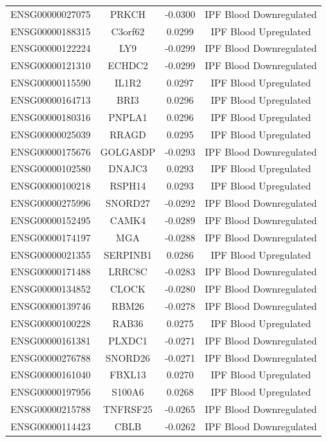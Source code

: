 \documentclass[
]{article}
\begin{document}
\begin{singlespace}
\begin{longtable}[t]{lccc}
ENSG00000027075 & PRKCH & -0.0300 & IPF Blood Downregulated\\
ENSG00000188315 & C3orf62 & 0.0299 & IPF Blood Upregulated\\
ENSG00000122224 & LY9 & -0.0299 & IPF Blood Downregulated\\
ENSG00000121310 & ECHDC2 & -0.0299 & IPF Blood Downregulated\\
\addlinespace
ENSG00000115590 & IL1R2 & 0.0297 & IPF Blood Upregulated\\
ENSG00000164713 & BRI3 & 0.0296 & IPF Blood Upregulated\\
ENSG00000180316 & PNPLA1 & 0.0296 & IPF Blood Upregulated\\
ENSG00000025039 & RRAGD & 0.0295 & IPF Blood Upregulated\\
ENSG00000175676 & GOLGA8DP & -0.0293 & IPF Blood Downregulated\\
\addlinespace
ENSG00000102580 & DNAJC3 & 0.0293 & IPF Blood Upregulated\\
ENSG00000100218 & RSPH14 & 0.0293 & IPF Blood Upregulated\\
ENSG00000275996 & SNORD27 & -0.0292 & IPF Blood Downregulated\\
ENSG00000152495 & CAMK4 & -0.0289 & IPF Blood Downregulated\\
ENSG00000174197 & MGA & -0.0288 & IPF Blood Downregulated\\
\addlinespace
ENSG00000021355 & SERPINB1 & 0.0286 & IPF Blood Upregulated\\
ENSG00000171488 & LRRC8C & -0.0283 & IPF Blood Downregulated\\
ENSG00000134852 & CLOCK & -0.0280 & IPF Blood Downregulated\\
ENSG00000139746 & RBM26 & -0.0278 & IPF Blood Downregulated\\
ENSG00000100228 & RAB36 & 0.0275 & IPF Blood Upregulated\\
\addlinespace
ENSG00000161381 & PLXDC1 & -0.0271 & IPF Blood Downregulated\\
ENSG00000276788 & SNORD26 & -0.0271 & IPF Blood Downregulated\\
ENSG00000161040 & FBXL13 & 0.0270 & IPF Blood Upregulated\\
ENSG00000197956 & S100A6 & 0.0268 & IPF Blood Upregulated\\
ENSG00000215788 & TNFRSF25 & -0.0265 & IPF Blood Downregulated\\
\addlinespace
ENSG00000114423 & CBLB & -0.0262 & IPF Blood Downregulated\\

\end{longtable}
\end{singlespace}
\end{document}
